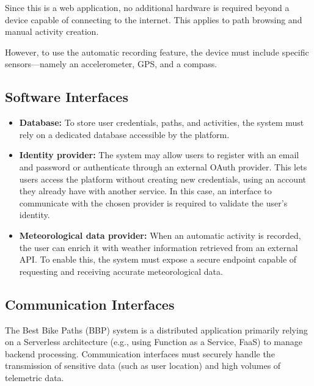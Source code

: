 Since this is a web application, no additional hardware is required beyond a device capable of connecting to the internet. This applies to path browsing and manual activity creation.

However, to use the automatic recording feature, the device must include specific sensors—namely an accelerometer, GPS, and a compass.


\subsection{Software Interfaces}
\label{subsec:software_interfaces}

\begin{itemize}
    \item \textbf{Database:} To store user credentials, paths, and activities, the system must rely on a dedicated database accessible by the platform.
    
    \item \textbf{Identity provider:} The system may allow users to register with an email and password or authenticate through an external OAuth provider. This lets users access the platform without creating new credentials, using an account they already have with another service. In this case, an interface to communicate with the chosen provider is required to validate the user’s identity.
    
    \item \textbf{Meteorological data provider:} When an automatic activity is recorded, the user can enrich it with weather information retrieved from an external API. To enable this, the system must expose a secure endpoint capable of requesting and receiving accurate meteorological data.
\end{itemize}

\subsection{Communication Interfaces}
\label{subsec:communication_interfaces}

The Best Bike Paths (BBP) system is a distributed application primarily relying on a Serverless architecture (e.g., using Function as a Service, FaaS) to manage backend processing. Communication interfaces must securely handle the transmission of sensitive data (such as user location) and high volumes of telemetric data.

